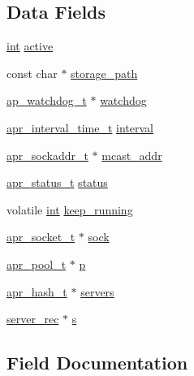 \subsection*{Data Fields}
\begin{DoxyCompactItemize}
\item 
\hyperlink{pcre_8txt_a42dfa4ff673c82d8efe7144098fbc198}{int} \hyperlink{structhm__ctx__t_ad53191cf566a9d4691229166e3a3de0b}{active}
\item 
const char $\ast$ \hyperlink{structhm__ctx__t_ade29350c8973de0d8aef761f64b73f0f}{storage\+\_\+path}
\item 
\hyperlink{structap__watchdog__t}{ap\+\_\+watchdog\+\_\+t} $\ast$ \hyperlink{structhm__ctx__t_ab11784488afa998d8e53024f60202bbd}{watchdog}
\item 
\hyperlink{group__apr__time_gaae2129185a395cc393f76fabf4f43e47}{apr\+\_\+interval\+\_\+time\+\_\+t} \hyperlink{structhm__ctx__t_a7e18c3b0daabce9e7e6bd251d9ef0198}{interval}
\item 
\hyperlink{structapr__sockaddr__t}{apr\+\_\+sockaddr\+\_\+t} $\ast$ \hyperlink{structhm__ctx__t_ac0da58be3871dc367fc7ef38570d0247}{mcast\+\_\+addr}
\item 
\hyperlink{group__apr__errno_gaa5105fa83cc322f09382292db8b47593}{apr\+\_\+status\+\_\+t} \hyperlink{structhm__ctx__t_a076c5b12f4784a2c343c83f78843a487}{status}
\item 
volatile \hyperlink{pcre_8txt_a42dfa4ff673c82d8efe7144098fbc198}{int} \hyperlink{structhm__ctx__t_a1754ff45271da103994813a7b6f68b96}{keep\+\_\+running}
\item 
\hyperlink{structapr__socket__t}{apr\+\_\+socket\+\_\+t} $\ast$ \hyperlink{structhm__ctx__t_aaf5bbdfaf71976380d8f977dbc52a83d}{sock}
\item 
\hyperlink{structapr__pool__t}{apr\+\_\+pool\+\_\+t} $\ast$ \hyperlink{structhm__ctx__t_af2ed149e32460ac612377daea8dec679}{p}
\item 
\hyperlink{structapr__hash__t}{apr\+\_\+hash\+\_\+t} $\ast$ \hyperlink{structhm__ctx__t_a9419ab025ba193e2ae05eae3f5f483c8}{servers}
\item 
\hyperlink{structserver__rec}{server\+\_\+rec} $\ast$ \hyperlink{structhm__ctx__t_a13327d0fb541970af63944b4a30fe1ec}{s}
\end{DoxyCompactItemize}


\subsection{Field Documentation}
